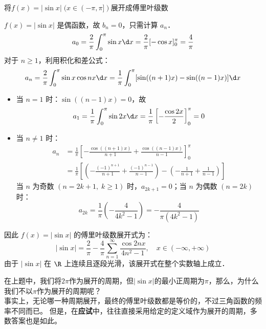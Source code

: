 \documentclass[12pt, a4paper, oneside, UTF8]{ctexbook}
\begin{document}
\begin{example}
    将$f(x)=|\sin x|\;(x\in(-\pi,\pi])$展开成傅里叶级数
\end{example}
\begin{solution}
    $f(x)=|\sin x|$ 是偶函数，故 $b_n = 0$，只需计算 $a_n$．
    \[ a_0 = \frac{2}{\pi} \int_{0}^{\pi} \sin x \d x = \frac{2}{\pi}[-\cos x]_{0}^{\pi} = \frac{4}{\pi} \]
    对于 $n \ge 1$，利用积化和差公式：
    \[ a_n = \frac{2}{\pi} \int_{0}^{\pi} \sin x \cos nx \d x = \frac{1}{\pi} \int_{0}^{\pi} [\sin((n+1)x) - \sin((n-1)x)] \d x \]
    \begin{itemize}
        \item 当 $n=1$ 时：$\sin((n-1)x) = 0$，故
        \[ a_1 = \frac{1}{\pi} \int_0^\pi \sin 2x \d x = \frac{1}{\pi} \left[-\frac{\cos 2x}{2}\right]_0^\pi = 0 \]
        \item 当 $n \neq 1$ 时：
        \begin{align*}
            a_n &= \frac{1}{\pi} \left[ -\frac{\cos((n+1)x)}{n+1} + \frac{\cos((n-1)x)}{n-1} \right]_{0}^{\pi} \\
            &= \frac{1}{\pi} \left[ \left( -\frac{(-1)^{n+1}}{n+1} + \frac{(-1)^{n-1}}{n-1} \right) - \left( -\frac{1}{n+1} + \frac{1}{n-1} \right) \right]
        \end{align*}
        当 $n$ 为奇数 $(n=2k+1,\;k\ge 1)$ 时，$a_{2k+1}=0$；当 $n$ 为偶数 $(n=2k)$ 时：
        \[ a_{2k} = \frac{1}{\pi} \left( -\frac{4}{4k^2-1} \right) = -\frac{4}{\pi(4k^2-1)} \]
    \end{itemize}
    因此 $f(x) = |\sin x|$ 的傅里叶级数展开式为：
    \[ \boxed{|\sin x| = \frac{2}{\pi} - \frac{4}{\pi} \sum_{n=1}^{\infty} \frac{\cos 2nx}{4n^2-1},\quad x\in(-\infty,+\infty)} \]
    由于 $|\sin x|$ 在 $\R$ 上连续且逐段光滑，该展开式在整个实数轴上成立．
\end{solution}

\begin{myRemark}
    在上题中，我们将$2\pi$作为展开的周期，但$|\sin x|$的最小正周期为$\pi$，那么，为什么我们不以$\pi$作为展开的周期呢？\\
    事实上，无论哪一种周期展开，最终的傅里叶级数都是等价的，不过三角函数的频率不同而已。
    但是，在\textbf{应试}中，往往直接采用给定的定义域作为展开的周期，多数答案也是如此。
\end{myRemark}
\end{document}
